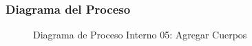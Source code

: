 \subsubsection{Diagrama del Proceso}
\begin{figure}[H]
    \centering
    \caption{Diagrama de Proceso Interno 05: Agregar Cuerpos}%
    \label{fig:process_diagram05}
\end{figure}
\newpage
